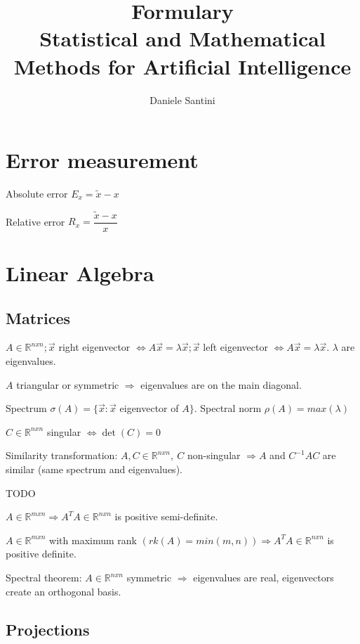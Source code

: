 \documentclass[]{article}
\title{Formulary \\ \large Statistical and Mathematical Methods for Artificial Intelligence}
\author{Daniele Santini}
\begin{document}
	
	
	\section{Error measurement}
	
	Absolute error $E_x = \tilde{x} - x$
	
	Relative error $R_x = \dfrac{\tilde{x} - x}{x}$
	
	\section{Linear Algebra}
	
	\subsection{Matrices}
	
	$A \in \mathbb{R}^{nxn}; \vec{x}$ right eigenvector $\Leftrightarrow A \vec{x} = \lambda \vec{x}; \vec{x}$ left eigenvector $\Leftrightarrow A \vec{x} = \lambda \vec{x}$. $\lambda$ are eigenvalues.
	
	$A$ triangular or symmetric $\Rightarrow$ eigenvalues are on the main diagonal.
	
	Spectrum $\sigma(A) = \{\vec{x}: \vec{x}$ eigenvector of $A\}$.
	Spectral norm $\rho(A) = max(\lambda)$
	
	$C \in \mathbb{R}^{nxn}$ singular $\Leftrightarrow \det(C)=0$
	
	Similarity transformation: $A, C \in \mathbb{R}^{nxn}, \ C$ non-singular $\Rightarrow A$ and $C^{-1} A C$ are similar (same spectrum and eigenvalues).
	
	
	
	TODO
	
	
	
	$A \in \mathbb{R}^{mxn} \Rightarrow A^T A \in \mathbb{R}^{nxn}$ is positive semi-definite.
	
	$A \in \mathbb{R}^{mxn}$ with maximum rank $(rk(A)=min(m,n)) \Rightarrow A^T A \in \mathbb{R}^{nxn}$ is positive definite.
	
	Spectral theorem: $A \in \mathbb{R}^{nxn}$ symmetric $\Rightarrow$ eigenvalues are real, eigenvectors create an orthogonal basis.
	
	\subsection{Projections}
	
\end{document}
